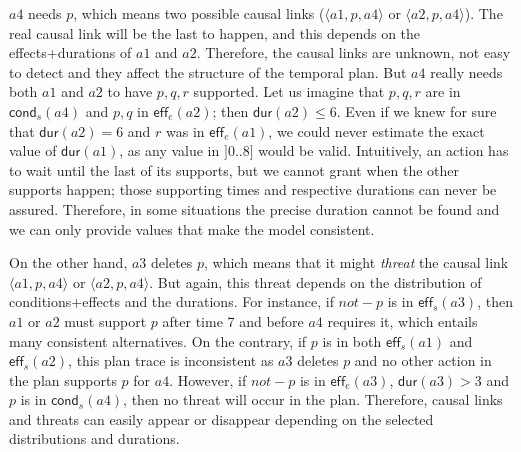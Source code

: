 \documentclass[runningheads]{llncs}
\newcommand{\tup}[1]{{\langle #1 \rangle}}
\newcommand{\eff}{\mathsf{eff}}    %
\newcommand{\cond}{\mathsf{cond}}  %
\newcommand{\dur}{\mathsf{dur}}    %
\begin{document}
$a4$ needs $p$, which means two possible causal links ($\tup{a1,p,a4}$ or $\tup{a2,p,a4}$). The real causal link will be the last to happen, and this depends on the effects+durations of $a1$ and $a2$. Therefore, the causal links are unknown, not easy to detect and they affect the structure of the temporal plan. But $a4$ really needs both $a1$ and $a2$ to have $p,q,r$ supported. Let us imagine that $p,q,r$ are in $\cond_s(a4)$ and $p,q$ in $\eff_e(a2)$; then $\dur(a2) \leq 6$. Even if we knew for sure that $\dur(a2)=6$ and $r$ was in $\eff_e(a1)$, we could never estimate the exact value of $\dur(a1)$, as any value in $]0..8]$ would be valid. Intuitively, an action has to wait until the last of its supports, but we cannot grant when the other supports happen; those supporting times and respective durations can never be assured. Therefore, in some situations the precise duration cannot be found and we can only provide values that make the model consistent.

On the other hand, $a3$ deletes $p$, which means that it might \emph{threat} the causal link $\tup{a1,p,a4}$ or $\tup{a2,p,a4}$. But again, this threat depends on the distribution of conditions+effects and the durations. For instance, if $not-p$ is in $\eff_s(a3)$, then $a1$ or $a2$ must support $p$ after time 7 and before $a4$ requires it, which entails many consistent alternatives. On the contrary, if $p$ is in both $\eff_s(a1)$ and $\eff_s(a2)$, this plan trace is inconsistent as $a3$ deletes $p$ and no other action in the plan supports $p$ for $a4$. However, if $not-p$ is in $\eff_e(a3)$, $\dur(a3) > 3$ and $p$ is in $\cond_s(a4)$, then no threat will occur in the plan. Therefore, causal links and threats can easily appear or disappear depending on the selected distributions and durations.
\end{document}
